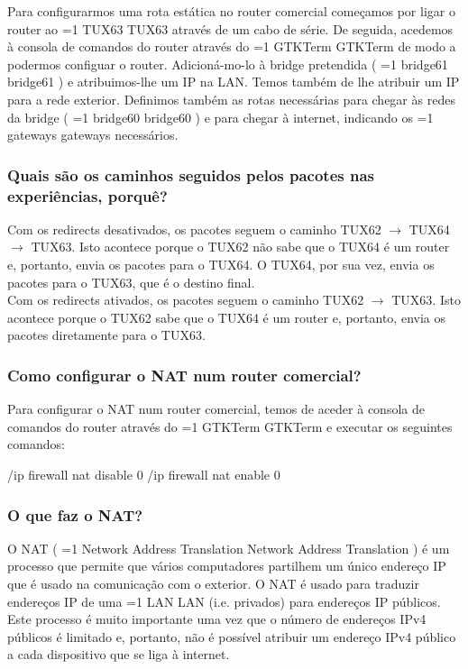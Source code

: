 \documentclass[11pt,a4paper]{article}
\newcommand{\hl}[2][1]{%
  \ifnum#1=1\relax
    \textcolor{text-hl1}{#2}%
  \else
    \textcolor{text-hl2}{#2}%
  \fi
}
\begin{document}
\begin{multicols}{2}
Para configurarmos uma rota estática no router comercial começamos por ligar o router ao \hl{TUX63} através de um cabo de série. De seguida, acedemos à consola de comandos do router através do \hl{GTKTerm} de modo a podermos configuar o router. Adicioná-mo-lo à bridge pretendida (\hl[2]{bridge61}) e atribuimos-lhe um IP na LAN. Temos também de lhe atribuir um IP para a rede exterior. Definimos também as rotas necessárias para chegar às redes da bridge (\hl[2]{bridge60}) e para chegar à internet, indicando os \hl{gateways} necessários.

\subsubsection{Quais são os caminhos seguidos pelos pacotes nas experiências, porquê?}\label{sec:exp4-caminhos}

Com os redirects desativados, os pacotes seguem o caminho TUX62 $\rightarrow$ TUX64 $\rightarrow$ TUX63. Isto acontece porque o TUX62 não sabe que o TUX64 é um router e, portanto, envia os pacotes para o TUX64. O TUX64, por sua vez, envia os pacotes para o TUX63, que é o destino final. \\
Com os redirects ativados, os pacotes seguem o caminho TUX62 $\rightarrow$ TUX63. Isto acontece porque o TUX62 sabe que o TUX64 é um router e, portanto, envia os pacotes diretamente para o TUX63.

\subsubsection{Como configurar o NAT num router comercial?}

Para configurar o NAT num router comercial, temos de aceder à consola de comandos do router através do \hl{GTKTerm} e executar os seguintes comandos:
\begin{bash-darktheme}
    /ip firewall nat disable 0
    /ip firewall nat enable 0
\end{bash-darktheme}

\subsubsection{O que faz o NAT?}

O NAT (\hl{Network Address Translation}) é um processo que permite que vários computadores partilhem um único endereço IP que é usado na comunicação com o exterior. O NAT é usado para traduzir endereços IP de uma \hl[2]{LAN} (i.e. privados) para endereços IP públicos.  
Este processo é muito importante uma vez que o número de endereços IPv4 públicos é limitado e, portanto, não é possível atribuir um endereço IPv4 público a cada dispositivo que se liga à internet.


\end{multicols}
\end{document}

